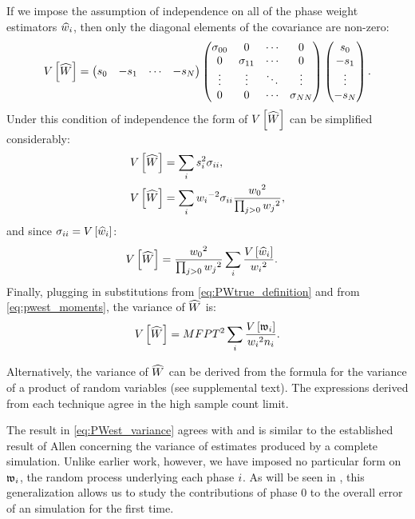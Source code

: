 If we impose the assumption of independence on all of the phase weight estimators $\widehat{w}_{i}$, then only the diagonal elements of the covariance are non-zero:
    \begin{equation*}
        V \left[ \widehat{W} \right] =
        \begin{pmatrix}
            s_0 & -s_1 & \cdots & -s_{N}
        \end{pmatrix}
        \begin{pmatrix}
            \sigma_{00} & 0           & \cdots & 0           \\
            0           & \sigma_{11} & \cdots & 0           \\
            \vdots      & \vdots      & \ddots & \vdots      \\
            0           & 0           & \cdots & \sigma_{N N}
        \end{pmatrix}
        \begin{pmatrix}
            s_0    \\ 
            -s_1    \\
            \vdots \\ 
            -s_{N}
        \end{pmatrix}.
    \end{equation*}
Under this condition of independence the form of $V \left[ \widehat{W} \right]$ can be simplified considerably:
    \begin{align*}
        V \left[ \widehat{W} \right] &= \sum_i s_i^2 \sigma_{ii}, \\
        V \left[ \widehat{W} \right] &= \sum_i w_{i} {}^{-2} \sigma_{ii} \frac{w_{0} {}^2}{\prod_{j>0} w_{j} {}^2},
    \end{align*}
and since $\sigma_{ii} = V \left[ \widehat{w}_{i} \right]$:
    \begin{align*}
        V \left[ \widehat{W} \right] &= \frac{w_{0} {}^2}{\prod_{j>0} w_{j} {}^2} \sum_i \frac{V \left[ \widehat{w}_{i} \right]}{w_{i} {}^2}.
    \end{align*}
Finally, plugging in substitutions from \eqref{eq:PWtrue_definition} and from \eqref{eq:pwest_moments}, the variance of $\widehat{W}$ is:    
    \begin{equation}\label{eq:PWest_variance}
        V \left[ \widehat{W} \right] = MFPT^2 \sum_i \frac{V \left[ \mathfrak{w}_{i} \right]}{w_{i} {}^2 n_i}.
    \end{equation}

Alternatively, the variance of $\widehat{W}$ can be derived from the formula for the variance of a product of random variables (see supplemental text). The expressions derived from each technique agree in the high sample count limit.

The result in \eqref{eq:PWest_variance} agrees with and is similar to the established result of Allen {\etal}\supercite{Allen:2006ch} concerning the variance of estimates produced by a complete  simulation. Unlike earlier work, however, we have imposed no particular form on $\mathfrak{w}_{i}$, the random process underlying each phase $i$. As will be seen in , this generalization allows us to study the contributions of phase 0 to the overall error of an  simulation for the first time.

